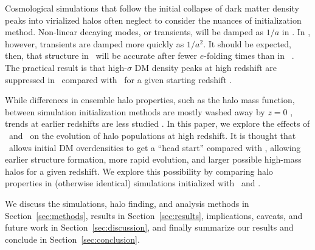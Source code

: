 

Cosmological simulations that follow the initial collapse of dark matter density peaks into virialized halos often neglect to consider the nuances of initialization method.  Non-linear decaying modes, or transients, will be damped as $1 / a$ in \za.  In \lpt, however, transients are damped more quickly as $1 / a^{2}$.  It should be expected, then, that structure in \lpt\ will be accurate after fewer $e$-folding times than in \za\ \citep{1998MNRAS.299.1097S, 2006MNRAS.373..369C, 2010MNRAS.403.1859J}.  The practical result is that high-$\sigma$ DM density peaks at high redshift are suppressed in \za\ compared with \lpt\ for a given starting redshift \citep{2006MNRAS.373..369C}.






While differences in ensemble halo properties, such as the halo mass function, between simulation initialization methods are mostly washed away by $z=0$ \citep{1998MNRAS.299.1097S}, trends at earlier redshifts are less studied \citep{2007ApJ...671.1160L}.  In this paper, we explore the effects of \za\ and \lpt\ on the evolution of halo populations at high redshift.  It is thought that \lpt\ allows initial DM overdensities to get a ``head start'' compared with \za, allowing earlier structure formation, more rapid evolution, and larger possible high-mass halos for a given redshift.  We explore this possibility by comparing halo properties in (otherwise identical) simulations initialized with \za\ and \lpt.

We discuss the simulations, halo finding, and analysis methods in Section~\ref{sec:methods}, results in Section~\ref{sec:results}, implications, caveats, and future work in Section~\ref{sec:discussion}, and finally summarize our results and conclude in Section~\ref{sec:conclusion}.




